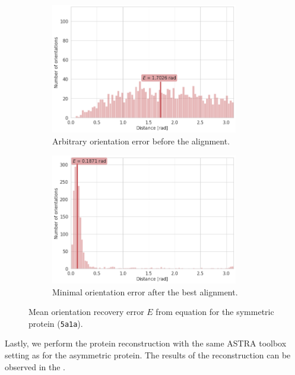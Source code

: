 \begin{figure}[ht!]
    \centering
    \begin{subfigure}[b]{0.45\textwidth}
        \includegraphics[height=5.7cm]{images/5a1a_noise0_angle_alignment_before.png}
        \caption{Arbitrary orientation error before the alignment.}
    \end{subfigure}
    \hfill
    \begin{subfigure}[b]{0.5\textwidth}
    \centering
        \includegraphics[height=5.7cm]{images/5a1a_noise0_angle_alignment_after.png}
        \caption{Minimal orientation error after the best alignment.}
    \end{subfigure}
    \caption{
        Mean orientation recovery error $E$ from equation  for the symmetric protein (\texttt{5a1a}).
    }
    \label{fig:angle-alignment-5a1a-noise0}
\end{figure}

Lastly, we perform the protein reconstruction with the same ASTRA toolbox setting as for the asymmetric protein. The results of the reconstruction can be observed in the .

